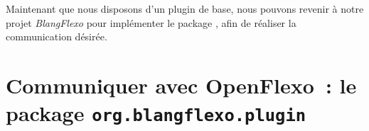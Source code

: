 Maintenant que nous disposons d'un plugin de base, nous pouvons revenir à notre projet \textit{BlangFlexo} pour implémenter le package , afin %
de réaliser la communication désirée.


\section{Communiquer avec OpenFlexo~: le package \texttt{org.blangflexo.plugin}}

